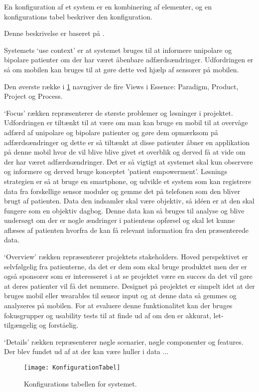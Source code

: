 En konfiguration af et system er en kombinering af elementer, og en konfigurations tabel beskriver den konfiguration.

Denne beskrivelse er baseret på  \citet[Afsnit 3.2]{art:essence}.

Systemets `use context' er at systemet bruges til at informere unipolare og bipolare patienter om der har været åbenbare adfærdsændringer. Udfordringen er så om mobilen kan bruges til at gøre dette ved hjælp af sensorer på mobilen.

Den øverste række i \cref{tab:konfigurationsTabel} navngiver de fire Views i Essence: Paradigm, Product, Project og Process.

`Focus' rækken repræsenterer de største problemer og løsninger i projektet. 
Udfordringen er tiltænkt til at være om man kan bruge en mobil til at overvåge adfærd af unipolare og bipolare patienter og gøre dem opmærksom på adfærdsændringer og dette er så tiltænkt at disse patienter åbner en applikation på denne mobil hvor de vil blive blive givet et overblik og derved få at vide om der har været adfærdsændringer. 
Det er så vigtigt at systemet skal kun observere og informere og derved bruge konceptet 'patient empowerment'.
Løsnings strategien er så at bruge en smartphone, og udvikle et system som kan registrere data fra forskellige sensor moduler og gemme det på telefonen som den bliver brugt af patienten.
Data den indsamler skal være objektiv, så idéen er at den skal fungere som en objektiv dagbog.
Denne data kan så bruges til analyse og blive undersøgt om der er nogle ændringer i patientens opførsel og skal let kunne aflæses af patienten hvorfra de kan få relevant information fra den præsenterede data. 

`Overview' rækken repræsenterer projektets stakeholders. Hoved perspektivet er selvfølgelig fra patienterne, da det er dem som skal bruge produktet men der er også sponsorer som er interesseret i at se projektet være en succes da det vil gøre at deres patienter vil få det nemmere. 
Designet på projektet er simpelt idet at der bruges mobil eller wearables til sensor input og at denne data så gemmes og analyseres på mobilen. 
For at evaluere denne funktionalitet kan der bruges fokusgrupper og usability tests til at finde ud af om den er akkurat, let-tilgængelig og forståelig.

`Details' rækken repræsenterer nøgle scenarier, nøgle componenter og features.
Der blev fundet ud af at der kan være huller i data ... 

\begin{figure}
\texttt{[image: KonfigurationTabel]}
\caption{Konfigurations tabellen for systemet.}
\label{tab:konfigurationsTabel}
\end{figure}
